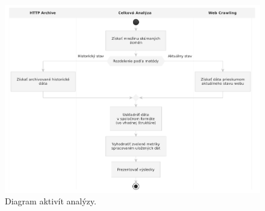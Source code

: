 \begin{figure}[!htb]
\begin{center}
 \includegraphics[scale=0.65]{obrazky-figures/analysis-activity-diagram-revised.pdf}    
 \caption{\centering Diagram aktivít analýzy.}
 \label{img:analysis-activity-diagram}
\end{center}
\end{figure}






